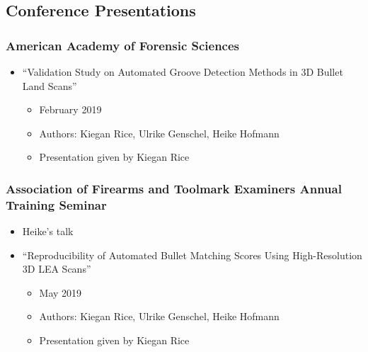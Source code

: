 \documentclass[]{book}
\providecommand{\tightlist}{%
  \setlength{\itemsep}{0pt}\setlength{\parskip}{0pt}}
\begin{document}
\hypertarget{conference-presentations}{%
\subsection{Conference Presentations}\label{conference-presentations}}

\hypertarget{american-academy-of-forensic-sciences}{%
\subsubsection{American Academy of Forensic Sciences}\label{american-academy-of-forensic-sciences}}

\begin{itemize}
\tightlist
\item
  ``Validation Study on Automated Groove Detection Methods in 3D Bullet Land Scans''

  \begin{itemize}
  \tightlist
  \item
    February 2019\\
  \item
    Authors: Kiegan Rice, Ulrike Genschel, Heike Hofmann
  \item
    Presentation given by Kiegan Rice
  \end{itemize}
\end{itemize}

\hypertarget{association-of-firearms-and-toolmark-examiners-annual-training-seminar}{%
\subsubsection{Association of Firearms and Toolmark Examiners Annual Training Seminar}\label{association-of-firearms-and-toolmark-examiners-annual-training-seminar}}

\begin{itemize}
\tightlist
\item
  Heike's talk
\item
  ``Reproducibility of Automated Bullet Matching Scores Using High-Resolution 3D LEA Scans''

  \begin{itemize}
  \tightlist
  \item
    May 2019
  \item
    Authors: Kiegan Rice, Ulrike Genschel, Heike Hofmann
  \item
    Presentation given by Kiegan Rice
  \end{itemize}
\end{itemize}
\end{document}

